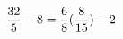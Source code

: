 \documentclass[preview]{standalone}
\begin{document}
\begin{align*}
\special{dvisvgm:raw <g id='unique000'>}\frac{32}{5} - 8 = \frac{6}{8} (\frac{8}{15}) - 2\special{dvisvgm:raw </g>}
\end{align*}
\end{document}

